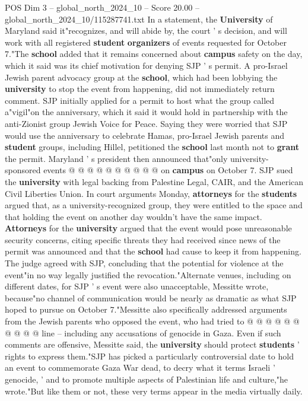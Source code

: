 \begin{textsample}{POS Dim 3 – global\_north\_2024\_10 – Score 20.00 – global\_north\_2024\_10/115287741.txt}
In a statement, the \textbf{University} of Maryland said it"recognizes, and will abide by, the court ' s decision, and will work with all registered \textbf{student} \textbf{organizers} of events requested for October 7."The \textbf{school} added that it remains concerned about \textbf{campus} safety on the day, which it said was its chief motivation for denying SJP ' s permit.
A pro-Israel Jewish parent advocacy group at the \textbf{school}, which had been lobbying the \textbf{university} to stop the event from happening, did not immediately return comment.
SJP initially applied for a permit to host what the group called a"vigil"on the anniversary, which it said it would hold in partnership with the anti-Zionist group Jewish Voice for Peace.
Saying they were worried that SJP would use the anniversary to celebrate Hamas, pro-Israel Jewish parents and \textbf{student} groups, including Hillel, petitioned the \textbf{school} last month not to \textbf{grant} the permit.
Maryland ' s president then announced that"only university-sponsored events @ @ @ @ @ @ @ @ @ @ on \textbf{campus} on October 7.
SJP sued the \textbf{university} with legal backing from Palestine Legal, CAIR, and the American Civil Liberties Union.
In court arguments Monday, \textbf{attorneys} for the \textbf{students} argued that, as a university-recognized group, they were entitled to the space and that holding the event on another day wouldn't have the same impact. \textbf{Attorneys} for the \textbf{university} argued that the event would pose unreasonable security concerns, citing specific threats they had received since news of the permit was announced and that the \textbf{school} had cause to keep it from happening.
The judge agreed with SJP, concluding that the potential for violence at the event"in no way legally justified the revocation."Alternate venues, including on different dates, for SJP ' s event were also unacceptable, Messitte wrote, because"no channel of communication would be nearly as dramatic as what SJP hoped to pursue on October 7."Messitte also specifically addressed arguments from the Jewish parents who opposed the event, who had tried to @ @ @ @ @ @ @ @ @ @ line -- including any accusations of genocide in Gaza.
Even if such comments are offensive, Messitte said, the \textbf{university} should protect \textbf{students} ' rights to express them."SJP has picked a particularly controversial date to hold an event to commemorate Gaza War dead, to decry what it terms Israeli ' genocide, ' and to promote multiple aspects of Palestinian life and culture,"he wrote."But like them or not, these very terms appear in the media virtually daily.

\end{textsample}
